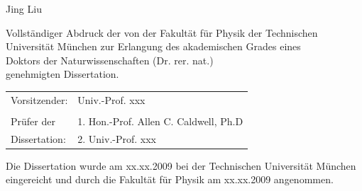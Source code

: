 \begin{titlepage}
\Large Jing Liu

\vspace{2. cm}

\normalsize Vollst\"andiger Abdruck der von der Fakult\"at f\"ur
Physik der Technischen Universit\"at M\"unchen zur Erlangung des
akademischen Grades eines \\
Doktors der Naturwissenschaften (Dr. rer. nat.) \\
genehmigten Dissertation. \\

\vspace{1.5 cm} 

\begin{table}[h]
  \centering
  \begin{tabular}{ll}
    Vorsitzender: & Univ.-Prof. xxx\\ 
    & \\ 
    Pr\"ufer der & 1. Hon.-Prof. Allen C. Caldwell, Ph.D \\ 
    Dissertation: & 2. Univ.-Prof. xxx \\ 
  \end{tabular}
\end{table}

\vspace{2.0 cm} 

Die Dissertation wurde am xx.xx.2009 bei der Technischen Universit\"at
M\"unchen eingereicht und durch die Fakult\"at f\"ur Physik am
xx.xx.2009 angenommen. \\

\end{titlepage} 

